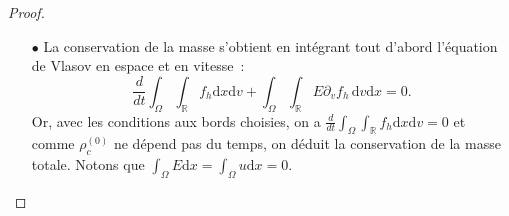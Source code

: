 \begin{proof}
%
\ 

  \begin{enumerate}
    \item[$\bullet$]La conservation de la masse s'obtient en intégrant tout d'abord l'équation de Vlasov en espace et en vitesse~: 
      $$
        \frac{d}{dt} \int_\Omega\int_{\mathbb{R}} f_h \mathrm{d}x \mathrm{d}v + \int_\Omega \int_{\mathbb{R}} E \partial_v f_h\,\mathrm{d}v\mathrm{d}x =0. 
      $$
      Or, avec les conditions aux bords choisies, on a  $\frac{d}{dt} \int_\Omega\int_{\mathbb{R}} f_h \mathrm{d}x \mathrm{d}v=0$ et comme $\rho^{(0)}_c$ ne dépend pas du temps, on déduit la conservation de la masse totale. Notons que $\int_\Omega E \mathrm{d}x = \int_\Omega u \mathrm{d}x = 0$. 


\end{enumerate}
\end{proof}
